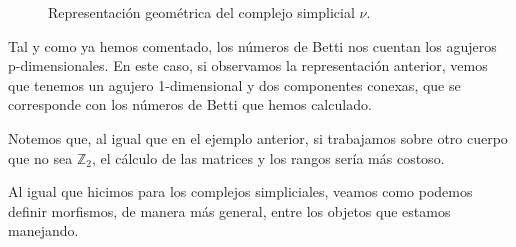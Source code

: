 \documentclass[12pt, a4paper, twoside]{book}
\numberwithin{equation}{section}
\theoremstyle{definition}
\newenvironment{ejem}
  {\pushQED{\qed}\renewcommand{\qedsymbol}{$\blacktriangleleft$}\ejemplo}
  {\popQED\endejemplo}
\theoremstyle{remark}
\theoremstyle{plain}
\begin{document}
\begin{ejem}
		\begin{figure}[!htbp]
			\centering
			\caption{Representación geométrica del complejo simplicial {\Large $\nu$}.}
			\label{fig:homs}
		\end{figure}
		
		Tal y como ya hemos comentado, los números de Betti nos 
		cuentan los agujeros p-dimensionales. En este caso, si 
		observamos la representación anterior, vemos que tenemos un 
		agujero 1-dimensional y dos componentes conexas, que se 
		corresponde con los números de Betti que hemos calculado. 

		Notemos que, al igual que en el ejemplo anterior, si 
		trabajamos sobre otro cuerpo que no sea $\mathbb{Z}_{2}$, el 
		cálculo de las matrices y los rangos sería más costoso.	
	\end{ejem}
	
	Al igual que hicimos para los complejos simpliciales, veamos como 
	podemos definir morfismos, de manera más general, entre los objetos 
	que estamos manejando.
	
\end{document}

